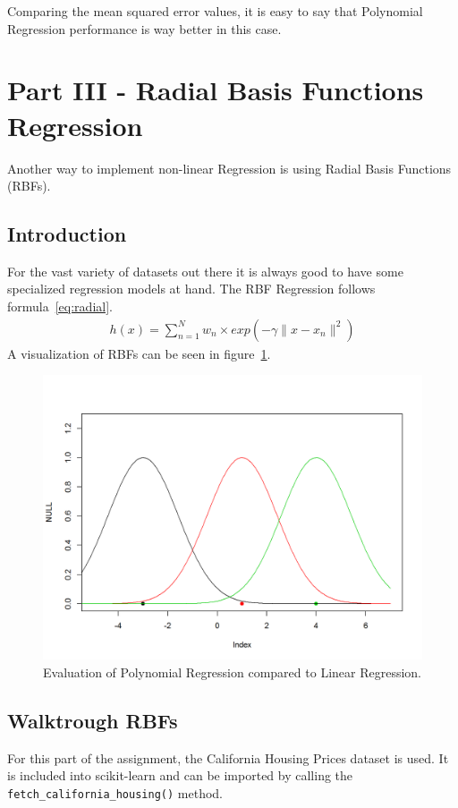 \documentclass{CPSReport}
\begin{document}
Comparing the mean squared error values, it is easy to say that Polynomial Regression performance is way better in this case.
\clearpage

\section{Part III - Radial Basis Functions Regression}
Another way to implement non-linear Regression is using Radial Basis Functions (RBFs).
\subsection{Introduction}
For the vast variety of datasets out there it is always good to have some specialized regression models at hand.
The RBF Regression follows formula~\eqref{eq:radial}.
\begin{align}\label{eq:radial}
    h(x) = \sum_{n=1}^N w_n \times exp(-\gamma \|x-x_n\|^2)
\end{align}
A visualization of RBFs can be seen in figure~\ref{fig:RBFs}.
\begin{figure}[ht]
    \centering
    \includegraphics[width=0.9\linewidth]{pics/RBFs.png}
    \caption{Evaluation of Polynomial Regression compared to Linear Regression.}
    \label{fig:RBFs}
\end{figure}

\subsection{Walktrough RBFs}
For this part of the assignment, the California Housing Prices dataset is used. It is included into scikit-learn and can be imported by calling the \texttt{fetch_california_housing()} method.
\end{document}

